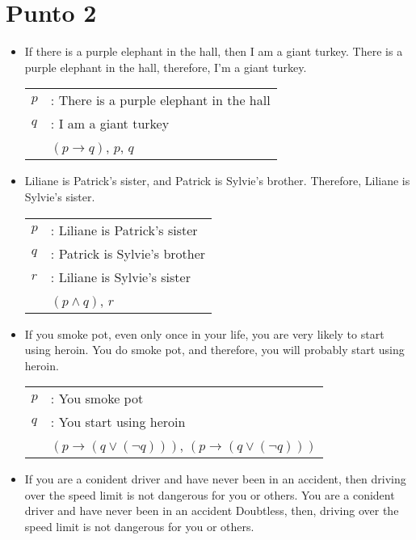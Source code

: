 \documentclass{article}
\begin{document}
\section{Punto 2}
\begin{itemize}
	\item If there is a purple elephant in the hall, then I am a giant turkey. There is a purple elephant in the hall, therefore, I'm a giant turkey.
	      \begin{center}
		      \begin{NiceTabular}{l l}
			      $p$ & : There is a purple elephant in the hall \\
			      $q$ & : I am a giant turkey                    \\
			      \hline
			          & $(p \to q)$, $p$, $q$
		      \end{NiceTabular}
	      \end{center}
	\item Liliane is Patrick's sister, and Patrick is Sylvie's brother. Therefore, Liliane is Sylvie's sister.
	      \begin{center}
		      \begin{NiceTabular}{l l}
			      $p$ & : Liliane is Patrick's sister \\
			      $q$ & : Patrick is Sylvie's brother \\
			      $r$ & : Liliane is Sylvie's sister  \\
			      \hline
			          & $(p \wedge q)$, $r$
		      \end{NiceTabular}
	      \end{center}
	\item If you smoke pot, even only once in your life, you are very likely to start using heroin. You do smoke pot, and therefore, you will probably start using heroin.
	      \begin{center}
		      \begin{NiceTabular}{l l}
			      $p$ & : You smoke pot                                            \\
			      $q$ & : You start using heroin                                   \\
			      \hline
			          & $(p \to (q \vee (\lnot q)))$, $(p \to (q \vee (\lnot q)))$
		      \end{NiceTabular}
	      \end{center}
	      \clearpage
	\item If you are a conident driver and have never been in an accident, then driving over the speed limit is not dangerous for you or others. You are a conident driver and have never been in an accident Doubtless, then, driving over the speed limit is not dangerous for you or others.

\end{itemize}
\end{document}

